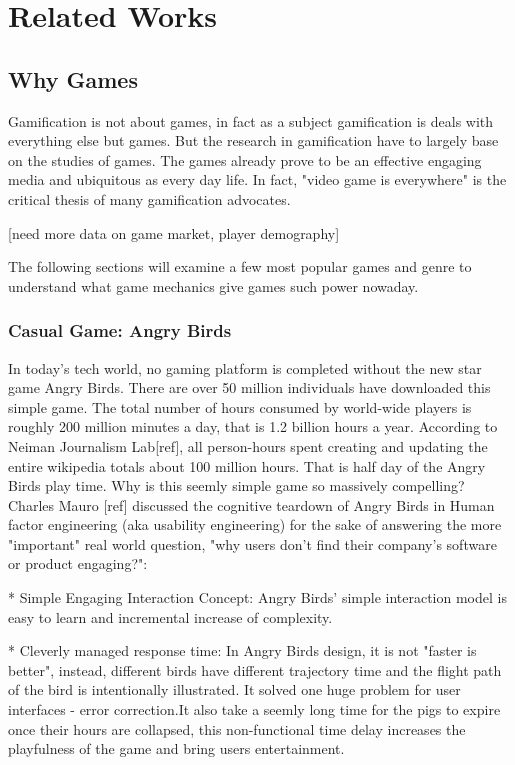 \chapter{Related Works}


\section{Why Games}
\label{sec:why-games}

Gamification is not about games, in fact as a subject gamification is deals with everything else but games. But the research in gamification have to largely base on the studies of games. The games already prove to be an effective engaging media and ubiquitous as every day life. In fact, "video game is everywhere" is the critical thesis of many gamification advocates. 

[need more data on game market, player demography]

The following sections will examine a few most popular games and genre to understand what game mechanics give games such power nowaday.

\subsection{Casual Game: Angry Birds}
In today's tech world, no gaming platform is completed without the new star game Angry Birds. There  are over 50 million individuals have downloaded this simple game. The total number of hours consumed by world-wide players is roughly 200 million minutes a day, that is 1.2 billion hours a year.  According to Neiman Journalism Lab[ref], all person-hours spent creating and updating the entire wikipedia totals about 100 million hours.  That is half day of the Angry Birds play time. Why is this seemly simple game so massively compelling? Charles Mauro [ref] discussed the cognitive teardown of Angry Birds in Human factor engineering (aka usability engineering) for the sake of answering the more "important" real world question, "why users don't find their company's software or product engaging?":

    * Simple Engaging Interaction Concept:
    Angry Birds' simple interaction model is easy to learn and incremental increase of complexity.

    * Cleverly managed response time: 
    In Angry Birds design, it is not "faster is better", instead, different birds have different trajectory time and the flight path of the bird is intentionally illustrated. It solved one huge problem for user interfaces - error correction.It also take a seemly long time for the pigs to expire once their hours are collapsed, this non-functional time delay increases the playfulness of the game and bring users entertainment.

